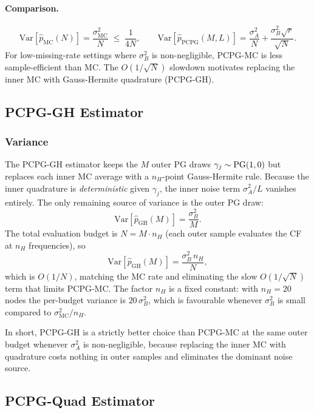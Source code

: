\paragraph{Comparison.}
\[
  \mathrm{Var}\!\left[\widehat{p}_{\mathrm{MC}}(N)\right] = \frac{\sigma^2_{\mathrm{MC}}}{N}
  \;\leq\; \frac{1}{4N},
  \qquad
  \mathrm{Var}\!\left[\widehat{p}_{\mathrm{PCPG}}(M,L)\right]
  = \frac{\sigma^2_A}{N} + \frac{\sigma^2_B\sqrt{r}}{\sqrt{N}}.
\]
For low-missing-rate settings where $\sigma^2_B$ is non-negligible, PCPG-MC
is less sample-efficient than MC.
The $O(1/\sqrt{N})$ slowdown motivates replacing the inner MC with
Gauss-Hermite quadrature (PCPG-GH).


\subsection{PCPG-GH Estimator}

\subsubsection{Variance}

The PCPG-GH estimator keeps the $M$ outer PG draws $\gamma_j \sim \mathrm{PG}(1,0)$ but
replaces each inner MC average with a $n_H$-point Gauss-Hermite rule.
Because the inner quadrature is \emph{deterministic} given $\gamma_j$, the inner
noise term $\sigma^2_A/L$ vanishes entirely.
The only remaining source of variance is the outer PG draw:
\[
  \mathrm{Var}\!\left[\widehat{p}_{\mathrm{GH}}(M)\right]
  = \frac{\sigma^2_B}{M}.
\]
The total evaluation budget is $N = M\cdot n_H$ (each outer sample evaluates the CF
at $n_H$ frequencies), so
\[
  \mathrm{Var}\!\left[\widehat{p}_{\mathrm{GH}}(M)\right]
  = \frac{\sigma^2_B\,n_H}{N},
\]
which is $O(1/N)$, matching the MC rate and eliminating the slow $O(1/\sqrt{N})$
term that limits PCPG-MC.
The factor $n_H$ is a fixed constant: with $n_H = 20$ nodes the per-budget
variance is $20\,\sigma^2_B$, which is favourable whenever $\sigma^2_B$ is small
compared to $\sigma^2_{\mathrm{MC}}/n_H$.

In short, PCPG-GH is a strictly better choice than PCPG-MC at the same outer
budget whenever $\sigma^2_A$ is non-negligible, because replacing the inner MC
with quadrature costs nothing in outer samples and eliminates the dominant noise
source.

\subsection{PCPG-Quad Estimator}

